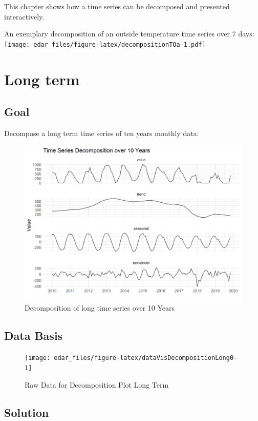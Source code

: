 \documentclass[
  a4paperpaper,
]{book}
\begin{document}
This chapter shows how a time series can be decomposed and presented interactively.

An exemplary decomposition of an outside temperature time series over 7 days:
\texttt{[image: edar\_files/figure-latex/decompositionTOa-1.pdf]}

\newpage

\hypertarget{long-term}{%
\section{Long term}\label{long-term}}

\hypertarget{goal-4}{%
\subsection{Goal}\label{goal-4}}

Decompose a long term time series of ten years monthly data:

\begin{figure}
\includegraphics[width=0.7\linewidth]{images/plotDecompositionLong} \caption{Decomposition of long time series over 10 Years}\label{fig:unnamed-chunk-13}
\end{figure}

\hypertarget{data-basis-4}{%
\subsection{Data Basis}\label{data-basis-4}}

\begin{figure}
\texttt{[image: edar\_files/figure-latex/dataVisDecompositionLong0-1]} \caption{Raw Data for Decomposition Plot Long Term}\label{fig:dataVisDecompositionLong0}
\end{figure}

\newpage

\hypertarget{solution-4}{%
\subsection{Solution}\label{solution-4}}
\end{document}

